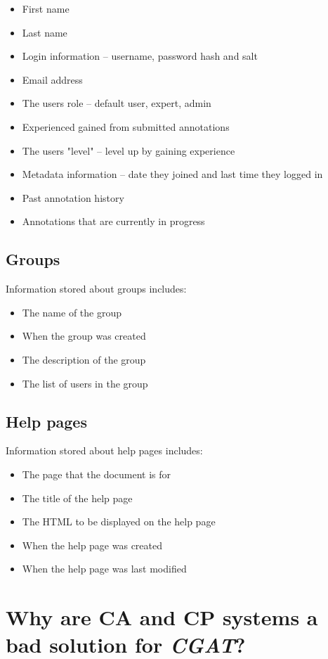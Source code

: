 \documentclass[12pt]{ucthesis}
\begin{document}
\begin{itemize}
\item First name
\item Last name
\item Login information -- username, password hash and salt
\item Email address
\item The users role -- default user, expert, admin
\item Experienced gained from submitted annotations
\item The users "level" -- level up by gaining experience
\item Metadata information -- date they joined and last time they logged in
\item Past annotation history
\item Annotations that are currently in progress
\end{itemize}

\subsection{Groups}
Information stored about groups includes:

\begin{itemize}
\item The name of the group
\item When the group was created
\item The description of the group
\item The list of users in the group
\end{itemize}

\subsection{Help pages}
Information stored about help pages includes:

\begin{itemize}
\item The page that the document is for
\item The title of the help page
\item The HTML to be displayed on the help page
\item When the help page was created
\item When the help page was last modified
\end{itemize}

\section{Why are CA and CP systems a bad solution for \textit{CGAT}?}
\label{mysql-impl}
\end{document}
